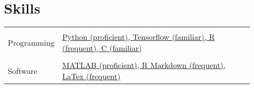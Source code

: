 \documentclass[a4paper,11pt]{article} %
\begin{document}
\section{Skills}

\begin{tabular}{p{2.5cm}|p{12.5cm}}

\multicolumn{2}{c}{}\\
Programming & \href{https://github.com/Roxanneyin}{Python (proficient), Tensorflow (familiar), R (frequent), C (familiar)}\\

\multicolumn{2}{c}{}\\
Software & \href{https://github.com/Roxanneyin}{MATLAB (proficient), R Markdown (frequent), LaTex (frequent)}\\

\end{tabular}
\end{document}
